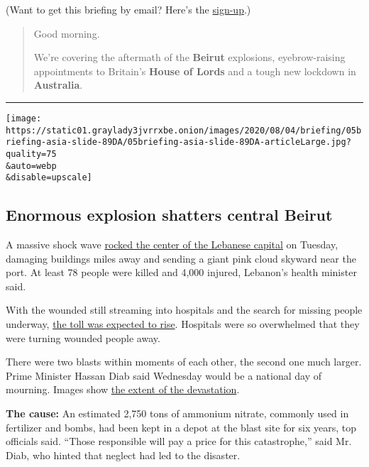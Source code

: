 (Want to get this briefing by email? Here's the
\href{https://www.nytimes3xbfgragh.onion/morning-briefing}{sign-up}.)

\begin{quote}
Good morning.

We're covering the aftermath of the \textbf{Beirut} explosions,
eyebrow-raising appointments to Britain's \textbf{House of Lords} and a
tough new lockdown in \textbf{Australia}.
\end{quote}

\begin{center}\rule{0.5\linewidth}{\linethickness}\end{center}

\texttt{[image: https://static01.graylady3jvrrxbe.onion/images/2020/08/04/briefing/05briefing-asia-slide-89DA/05briefing-asia-slide-89DA-articleLarge.jpg?quality=75\\\&auto=webp\\\&disable=upscale]}

\hypertarget{enormous-explosion-shatters-central-beirut}{%
\subsection{Enormous explosion shatters central
Beirut}\label{enormous-explosion-shatters-central-beirut}}

A massive shock wave
\href{https://www.nytimes3xbfgragh.onion/2020/08/04/world/middleeast/beirut-explosion-blast.html?action=click\&module=Top\%20Stories\&pgtype=Homepage}{rocked
the center of the Lebanese capital} on Tuesday, damaging buildings miles
away and sending a giant pink cloud skyward near the port. At least 78
people were killed and 4,000 injured, Lebanon's health minister said.

With the wounded still streaming into hospitals and the search for
missing people underway,
\href{https://www.nytimes3xbfgragh.onion/2020/08/04/world/middleeast/beirut-explosion-blast.html?action=click\&module=Top\%20Stories\&pgtype=Homepage}{the
toll was expected to rise}. Hospitals were so overwhelmed that they were
turning wounded people away.

There were two blasts within moments of each other, the second one much
larger. Prime Minister Hassan Diab said Wednesday would be a national
day of mourning. Images show
\href{https://www.nytimes3xbfgragh.onion/2020/08/04/world/middleeast/beirut-lebanon-explosions-photos.html}{the
extent of the devastation}.

\textbf{The cause:} An estimated 2,750 tons of ammonium nitrate,
commonly used in fertilizer and bombs, had been kept in a depot at the
blast site for six years, top officials said. ``Those responsible will
pay a price for this catastrophe,'' said Mr. Diab, who hinted that
neglect had led to the disaster.

